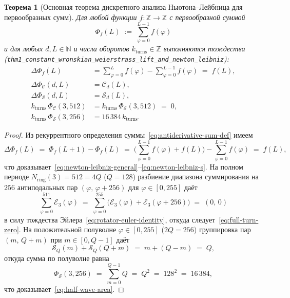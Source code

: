 \documentclass[11pt,a4paper]{article}
\theoremstyle{plain}
\newtheorem{theorem}{Теорема}[section]
\theoremstyle{definition}
\begin{document}
\begin{theorem}[Основная теорема дискретного анализа Ньютона--Лейбница для первообразных сумм]
\label{thm:main-1c}
Для любой функции $f\colon \mathbb{Z} \to \mathbb{Z}$ с первообразной суммой
\begin{equation}
  \label{eq:antiderivative-sum-def}
  \Phi_f(L) \;:=\; \sum_{\varphi=0}^{L-1} f(\varphi)
\end{equation}
и для любых $d, L \in \mathbb{N}$ и числа оборотов $k_{\mathrm{turns}} \in \mathbb{Z}$ выполняются тождества (\texttt{thm1\_constant\_wronskian\_weierstrass\_lift\_and\_newton\_leibniz}):
\begin{align}
  \Delta\Phi_f(L) &= \sum_{\varphi=0}^{L} f(\varphi) - \sum_{\varphi=0}^{L-1} f(\varphi) \;=\; f(L), \label{eq:newton-leibniz-general} \\
  \Delta\Phi_{\mathcal{C}}(d, L) &= \mathcal{C}_d(L), \label{eq:newton-leibniz-c} \\
  \Delta\Phi_{\mathcal{S}}(d, L) &= \mathcal{S}_d(L), \label{eq:newton-leibniz-s} \\
  k_{\mathrm{turns}}\,\Phi_{\mathcal{C}}(3, 512) &= k_{\mathrm{turns}}\,\Phi_{\mathcal{S}}(3, 512) \;=\; 0, \label{eq:full-turn-zero} \\
  k_{\mathrm{turns}}\,\Phi_{\mathcal{S}}(3, 256) &= 16\,384\,k_{\mathrm{turns}}. \label{eq:half-wave-area}
\end{align}
\end{theorem}

\begin{proof}
Из рекуррентного определения суммы~\eqref{eq:antiderivative-sum-def} имеем
\begin{equation*}
  \Delta\Phi_f(L) \;=\; \Phi_f(L + 1) - \Phi_f(L) \;=\; \biggl(\sum_{\varphi=0}^{L-1} f(\varphi) + f(L)\biggr) - \sum_{\varphi=0}^{L-1} f(\varphi) \;=\; f(L),
\end{equation*}
что доказывает~\eqref{eq:newton-leibniz-general}--\eqref{eq:newton-leibniz-s}. На полном периоде $N_{\mathrm{ring}}(3) = 512 = 4Q$ ($Q = 128$) разбиение диапазона суммирования на $256$ антиподальных пар $(\varphi,\, \varphi + 256)$ для $\varphi \in [0, 255]$ даёт
\begin{equation*}
  \sum_{\varphi=0}^{511} \mathcal{E}_3(\varphi) \;=\; \sum_{\varphi=0}^{255} \bigl(\mathcal{E}_3(\varphi) + \mathcal{E}_3(\varphi + 256)\bigr) \;=\; (0,\, 0)
\end{equation*}
в силу тождества Эйлера~\eqref{eq:rotator-euler-identity}, откуда следует~\eqref{eq:full-turn-zero}. На положительной полуволне $\varphi \in [0, 255]$ ($2Q = 256$) группировка пар $(m,\, Q + m)$ при $m \in [0, Q - 1]$ даёт
\begin{equation*}
  \mathcal{S}_Q(m) + \mathcal{S}_Q(Q + m) \;=\; m + (Q - m) \;=\; Q,
\end{equation*}
откуда сумма по полуволне равна
\begin{equation*}
  \Phi_{\mathcal{S}}(3, 256) \;=\; \sum_{m=0}^{Q-1} Q \;=\; Q^2 \;=\; 128^2 \;=\; 16\,384,
\end{equation*}
что доказывает~\eqref{eq:half-wave-area}.
\end{proof}
\end{document}
